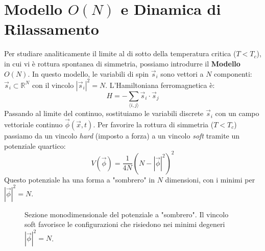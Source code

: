 \section{Modello $O(N)$ e Dinamica di Rilassamento}
Per studiare analiticamente il limite al di sotto della temperatura critica ($T < T_c$), in cui vi è rottura spontanea di simmetria, possiamo introdurre il \textbf{Modello $O(N)$}. In questo modello, le variabili di spin $\vec{s}_i$ sono vettori a $N$ componenti: $\vec{s}_i \subset \mathbb{R}^N$ con il vincolo $|\vec{s}_i|^2 = N$.
L'Hamiltoniana ferromagnetica è:
\begin{equation}
    H = - \sum_{\langle i, j \rangle} \vec{s}_i \cdot \vec{s}_j
\end{equation}
Passando al limite del continuo, sostituiamo le variabili discrete $\vec{s}_i$ con un campo vettoriale continuo $\vec{\phi}(\vec{x}, t)$. Per favorire la rottura di simmetria ($T < T_c$) passiamo da un vincolo \textit{hard} (imposto a forza) a un vincolo \textit{soft} tramite un potenziale quartico:
\begin{equation}
    V(\vec{\phi}) = \frac{1}{4N} \left( N - |\vec{\phi}|^2 \right)^2
\end{equation}
Questo potenziale ha una forma a "sombrero" in $N$ dimensioni, con i minimi per $|\vec{\phi}|^2 = N$.

\begin{figure}[H]
    \centering
    \caption{Sezione monodimensionale del potenziale a "sombrero". Il vincolo soft favorisce le configurazioni che risiedono nei minimi degeneri $|\vec{\phi}|^2 = N$.}
\end{figure}

